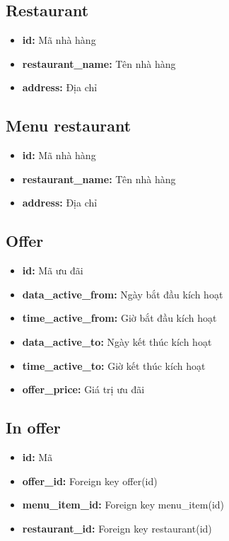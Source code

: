 \documentclass[a4paper,12pt]{article}
\begin{document}
\subsection{Restaurant}
\begin{itemize}
	\item \textbf{id: } Mã nhà hàng
	\item \textbf{restaurant\_name:} Tên nhà hàng
	\item \textbf{address:} Địa chỉ
\end{itemize}
\subsection{Menu restaurant}
\begin{itemize}
	\item \textbf{id: } Mã nhà hàng
	\item \textbf{restaurant\_name:} Tên nhà hàng
	\item \textbf{address:} Địa chỉ
\end{itemize}
\subsection{Offer}
\begin{itemize}
	\item \textbf{id: } Mã ưu đãi
	\item \textbf{data\_active\_from:} Ngày bắt đầu kích hoạt
	\item \textbf{time\_active\_from:} Giờ bắt đầu kích hoạt
	\item \textbf{data\_active\_to:} Ngày kết thúc kích hoạt
	\item \textbf{time\_active\_to:} Giờ kết thúc kích hoạt
	\item \textbf{offer\_price:} Giá trị ưu đãi
\end{itemize}
\subsection{In offer}
\begin{itemize}
	\item \textbf{id: } Mã
	\item \textbf{offer\_id: } Foreign key offer(id)
	\item \textbf{menu\_item\_id: } Foreign key menu\_item(id)
	\item \textbf{restaurant\_id: } Foreign key restaurant(id)
\end{itemize}
\end{document}
